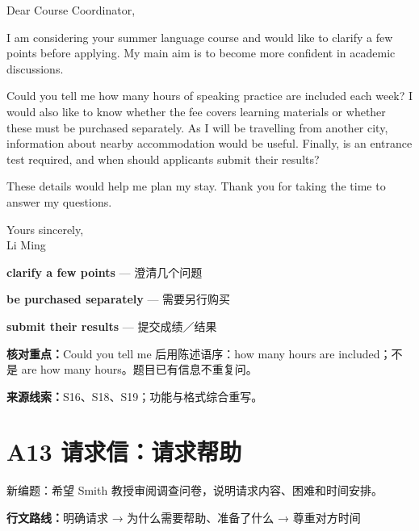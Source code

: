 \documentclass[11pt,a4paper,fontset=macnew]{ctexart}
\newenvironment{example}{\begingroup\fontsize{11}{14.3}\selectfont\setlength{\parskip}{4pt}}{\par\endgroup}
\begin{document}
\begin{example}
\noindent Dear Course Coordinator,\par
I am considering your summer language course and would like to clarify a few points before applying. My main aim is to become more confident in academic discussions.

Could you tell me how many hours of speaking practice are included each week? I would also like to know whether the fee covers learning materials or whether these must be purchased separately. As I will be travelling from another city, information about nearby accommodation would be useful. Finally, is an entrance test required, and when should applicants submit their results?

These details would help me plan my stay. Thank you for taking the time to answer my questions.

\noindent Yours sincerely,\\Li Ming\par
\end{example}
\par\vspace{4pt}{\bfseries 好词好句：优先记这三处}\par\nopagebreak
{\small\textbf{clarify a few points} — 澄清几个问题}\par
{\small\textbf{be purchased separately} — 需要另行购买}\par
{\small\textbf{submit their results} — 提交成绩／结果}\par
{\small\textbf{核对重点：}Could you tell me 后用陈述语序：how many hours are included；不是 are how many hours。题目已有信息不重复问。}\par
{\fontsize{8}{10}\selectfont\textbf{来源线索：}S16、S18、S19；功能与格式综合重写。}\par
\clearpage\section*{A13  请求信：请求帮助}
{\small 新编题：希望 Smith 教授审阅调查问卷，说明请求内容、困难和时间安排。}\par
{\small\textbf{行文路线：}明确请求 → 为什么需要帮助、准备了什么 → 尊重对方时间}\par
\par\vspace{4pt}{\bfseries 可替换模板}\par\nopagebreak
\end{document}
